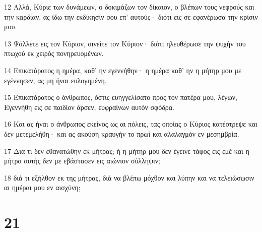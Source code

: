 \par 12 Αλλά, Κύριε των δυνάμεων, ο δοκιμάζων τον δίκαιον, ο βλέπων τους νεφρούς και την καρδίαν, ας ίδω την εκδίκησίν σου επ' αυτούς· διότι εις σε εφανέρωσα την κρίσιν μου.
\par 13 Ψάλλετε εις τον Κύριον, αινείτε τον Κύριον· διότι ηλευθέρωσε την ψυχήν του πτωχού εκ χειρός πονηρευομένων.
\par 14 Επικατάρατος η ημέρα, καθ' ην εγεννήθην· η ημέρα καθ' ην η μήτηρ μου με εγέννησεν, ας μη ήναι ευλογημένη.
\par 15 Επικατάρατος ο άνθρωπος, όστις ευηγγελίσατο προς τον πατέρα μου, λέγων, Εγεννήθη εις σε παιδίον άρσεν, ευφραίνων αυτόν σφόδρα.
\par 16 Και ας ήναι ο άνθρωπος εκείνος ως αι πόλεις, τας οποίας ο Κύριος κατέστρεψε και δεν μετεμελήθη· και ας ακούση κραυγήν το πρωΐ και αλαλαγμόν εν μεσημβρία.
\par 17 Διά τι δεν εθανατώθην εκ μήτρας; ή η μήτηρ μου δεν έγεινε τάφος εις εμέ και η μήτρα αυτής δεν με εβάστασεν εις αιώνιον σύλληψιν;
\par 18 διά τι εξήλθον εκ της μήτρας, διά να βλέπω μόχθον και λύπην και να τελειώσωσιν αι ημέραι μου εν αισχύνη;

\chapter{21}

